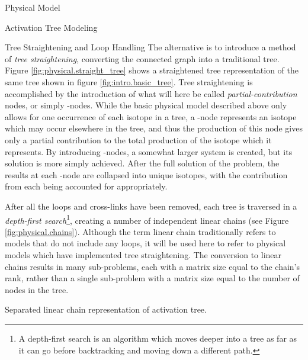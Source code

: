 \begin{chapter}{Physical Model\label{chap:physical}}
\begin{section}{Activation Tree Modeling\label{sec:physical.chains}}
\begin{subsection}{Tree Straightening and Loop Handling\label{sec:physical.chains.loops}}
    The alternative is to introduce a method of \textsl{tree
      straightening}, converting the connected graph into a
    traditional \nary tree.  Figure \ref{fig:physical.straight_tree}
    shows a straightened tree representation of the same tree shown in
    figure \ref{fig:intro.basic_tree}.  Tree straightening is
    accomplished by the introduction of what will here be called
    \textsl{partial-contribution} nodes, or simply \pc-nodes.  While
    the basic physical model described above only allows for one
    occurrence of each isotope in a tree, a \pc-node represents an
    isotope which may occur elsewhere in the tree, and thus the
    production of this node gives only a partial contribution to the
    total production of the isotope which it represents.  By
    introducing \pc-nodes, a somewhat larger system is created, but
    its solution is more simply achieved.  After the full solution of
    the problem, the results at each \pc-node are collapsed into
    unique isotopes, with the contribution from each being accounted
    for appropriately.
    
    After all the loops and cross-links have been removed, each tree
    is traversed in a \textsl{depth-first search}\footnote{A
      depth-first search is an algorithm which moves deeper into a
      tree as far as it can go before backtracking and moving down a
      different path.}, creating a number of independent linear chains
    (see Figure \ref{fig:physical.chains}).  Although the term linear
    chain traditionally refers to models that do not include any
    loops, it will be used here to refer to physical models which have
    implemented tree straightening.  The conversion to linear chains
    results in many sub-problems, each with a matrix size equal to the
    chain's rank, rather than a single sub-problem with a matrix size
    equal to the number of nodes in the tree.
    
    \begin{floatingfigure}{0.55\columnwidth}
      \begin{center}
        \caption{Separated linear chain representation of activation tree.}\label{fig:physical.chains}
      \end{center}
    \end{floatingfigure}
    

\end{subsection}
\end{section}
\end{chapter}
